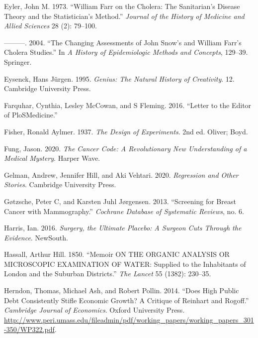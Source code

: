 \documentclass[
  10pt,
  b5paper]{book}
\newlength{\cslhangindent}
\newlength{\cslentryspacingunit} %
\newenvironment{CSLReferences}[2] %
 {%
  \setlength{\parindent}{0pt}
  \ifodd #1
  \let\oldpar\par
  \def\par{\hangindent=\cslhangindent\oldpar}
  \fi
  \setlength{\parskip}{#2\cslentryspacingunit}
 }%
 {}
\begin{document}
\begin{CSLReferences}{1}{0}
\leavevmode{}%
Eyler, John M. 1973. {``William Farr on the Cholera: The Sanitarian's Disease Theory and the Statistician's Method.''} \emph{Journal of the History of Medicine and Allied Sciences} 28 (2): 79--100.

\leavevmode{}%
---------. 2004. {``The Changing Assessments of John Snow's and William Farr's Cholera Studies.''} In \emph{A History of Epidemiologic Methods and Concepts}, 129--39. Springer.

\leavevmode{}%
Eysenck, Hans Jürgen. 1995. \emph{Genius: The Natural History of Creativity}. 12. Cambridge University Press.

\leavevmode{}%
Farquhar, Cynthia, Lesley McCowan, and S Fleming. 2016. {``Letter to the Editor of PloSMedicine.''}

\leavevmode{}%
Fisher, Ronald Aylmer. 1937. \emph{The Design of Experiments}. 2nd ed. Oliver; Boyd.

\leavevmode{}%
Fung, Jason. 2020. \emph{The Cancer Code: A Revolutionary New Understanding of a Medical Mystery}. Harper Wave.

\leavevmode{}%
Gelman, Andrew, Jennifer Hill, and Aki Vehtari. 2020. \emph{Regression and Other Stories}. Cambridge University Press.

\leavevmode{}%
Gøtzsche, Peter C, and Karsten Juhl Jørgensen. 2013. {``Screening for Breast Cancer with Mammography.''} \emph{Cochrane Database of Systematic Reviews}, no. 6.

\leavevmode{}%
Harris, Ian. 2016. \emph{Surgery, the Ultimate Placebo: A Surgeon Cuts Through the Evidence}. NewSouth.

\leavevmode{}%
Hassall, Arthur Hill. 1850. {``Memoir ON THE ORGANIC ANALYSIS OR MICROSCOPIC EXAMINATION OF WATER: Supplied to the Inhabitants of London and the Suburban Districts.''} \emph{The Lancet} 55 (1382): 230--35.

\leavevmode{}%
Herndon, Thomas, Michael Ash, and Robert Pollin. 2014. {``Does High Public Debt Consistently Stifle Economic Growth? A Critique of Reinhart and Rogoff.''} \emph{Cambridge Journal of Economics}. Oxford University Press. \url{http://www.peri.umass.edu/fileadmin/pdf/working_papers/working_papers_301-350/WP322.pdf}.


\end{CSLReferences}
\end{document}
